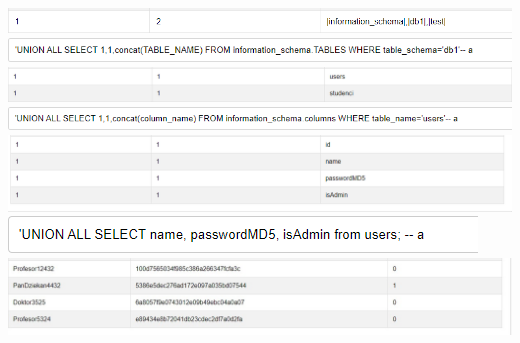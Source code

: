 \documentclass{article}
\begin{document}
\includegraphics[width=\textwidth]{"image26.png"}
\vspace{3mm}
\includegraphics[width=\textwidth]{"image27.png"}
\vspace{3mm}
\includegraphics[width=\textwidth]{"image28.png"}
\vspace{3mm}
\includegraphics[width=\textwidth]{"image29.png"}
\vspace{3mm}
\includegraphics[width=\textwidth]{"image30.png"}
\vspace{3mm}
\includegraphics[width=\textwidth]{"image31.png"}
\vspace{3mm}
\includegraphics[width=\textwidth]{"image32.jpeg"}
\end{document}
